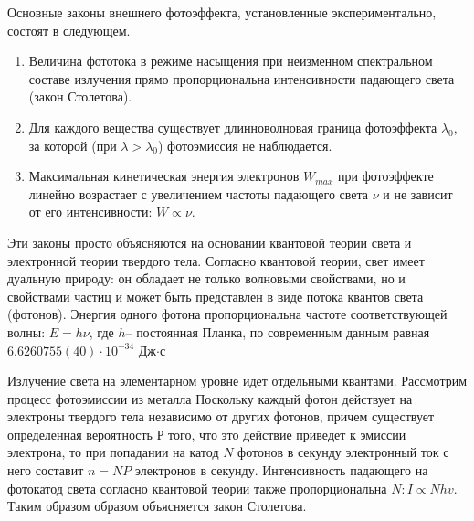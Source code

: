 Основные законы внешнего фотоэффекта, установленные экспериментально, состоят в следующем.
\begin{enumerate}
 	\item Величина фототока в режиме насыщения при неизменном спектральном составе излучения прямо пропорциональна интенсивности падающего света (закон Столетова).
	 \item Для каждого вещества существует длинноволновая граница фотоэффекта $\lambda_0$, за которой (при $\lambda>\lambda_0$) фотоэмиссия не наблюдается.
	 \item Максимальная кинетическая энергия электронов $W_{max}$ при фотоэффекте линейно возрастает с увеличением частоты падающего света $\nu$ и не зависит от его интенсивности: $W\propto \nu$.
\end{enumerate}

Эти законы просто объясняются на основании квантовой теории света и электронной теории твердого тела. Согласно квантовой теории, свет имеет дуальную природу: он обладает не только волновыми свойствами, но и свойствами частиц и может быть представлен в виде потока квантов света (фотонов). Энергия одного фотона пропорциональна частоте соответствующей волны: $E=h \nu$, где $h$-- постоянная Планка, по современным данным равная $6.6260755(40)\cdot10^{-34}$ Дж$\cdot$с

Излучение света на элементарном уровне идет отдельными квантами. Рассмотрим процесс фотоэмиссии из металла Поскольку каждый фотон действует на электроны твердого тела независимо от других фотонов, причем существует определенная вероятность $Р$ того, что это действие приведет к эмиссии электрона, то при попадании на катод $N$ фотонов в секунду электронный ток с него составит $n=NP$ электронов в секунду. Интенсивность падающего на фотокатод света согласно квантовой теории также пропорциональна $N: I\propto Nhv$. Таким образом образом объясняется закон Столетова.

